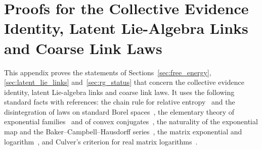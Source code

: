 \clearpage
\section{Proofs for the Collective Evidence Identity, Latent Lie-Algebra Links and Coarse Link Laws}\label{app:latent_link_proofs}

This appendix proves the statements of Sections~\ref{sec:free_energy}, \ref{sec:latent_lie_links} and~\ref{sec:rg_status} that concern the collective evidence identity, latent Lie-algebra links and coarse link laws. It uses the following standard facts with references: the chain rule for relative entropy~\cite{CoverThomas2006} and the disintegration of laws on standard Borel spaces~\cite{Kallenberg2021}, the elementary theory of exponential families~\cite{Brown1986} and of convex conjugates~\cite{Rockafellar1970}, the naturality of the exponential map and the Baker--Campbell--Hausdorff series~\cite{Hall2015}, the matrix exponential and logarithm~\cite{Higham2008}, and Culver's criterion for real matrix logarithms~\cite{culver1966existence}.

